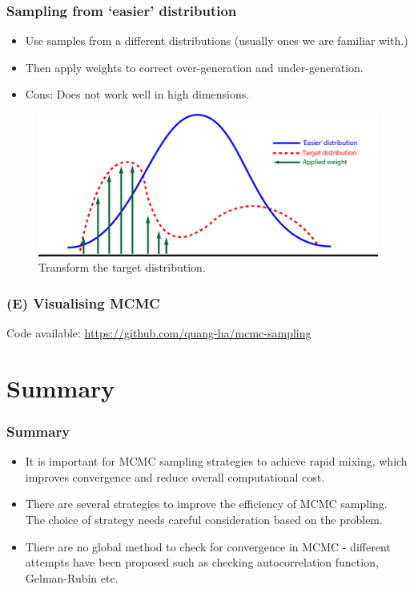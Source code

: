 \documentclass[10pt]{beamer}
\begin{document}
\begin{frame}
	\frametitle{Sampling from `easier' distribution}
	\begin{itemize}
		\item Use samples from a different distributions (usually ones we are familiar with.)
		\item Then apply weights to correct over-generation and under-generation.
		\item Cons: Does not work well in high dimensions.
	\end{itemize}
	\begin{figure}[h]
		\centering
		\includegraphics[width=\textwidth]{importance-sampling}
		\caption{Transform the target distribution.}
	\end{figure}	
\end{frame}

\begin{frame}
	\frametitle{(E) Visualising MCMC}
	Code available: \url{https://github.com/quang-ha/mcmc-sampling}
	\centering
\end{frame}

\section{Summary}
\begin{frame}[plain]
	\frametitle{Summary}
	\begin{itemize}
		\item It is important for MCMC sampling strategies to achieve rapid mixing, which improves convergence and reduce overall computational cost.
		\item There are several strategies to improve the efficiency of MCMC sampling. The choice of strategy needs careful consideration based on the problem.
		\item There are no global method to check for convergence in MCMC - different attempts have been proposed such as checking autocorrelation function, Gelman-Rubin etc.
	\end{itemize}
\end{frame}
	
\end{document}
